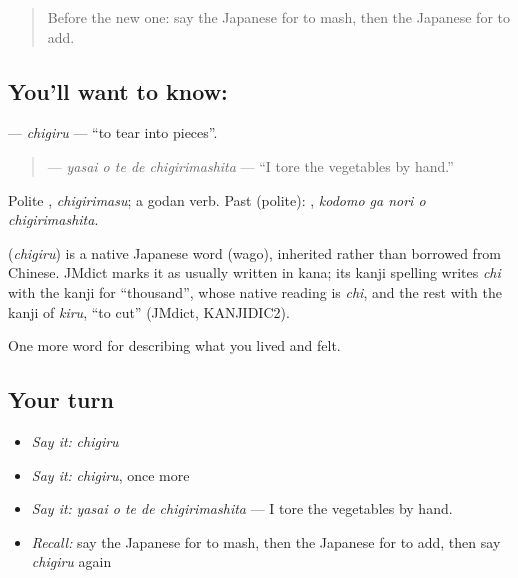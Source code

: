 \label{lesson:JA-C474-chigiru}



\begin{quote}
Before the new one: say the Japanese for to mash, then the Japanese for to add.
\end{quote}

\subsection*{You'll want to know: }
\textbf{} — \emph{chigiru} — \textquotedblleft{}to tear into pieces\textquotedblright{}.

\begin{quote}
\textbf{  } — \emph{yasai o te de chigirimashita} — \textquotedblleft{}I tore the vegetables by hand.\textquotedblright{}
\end{quote}

Polite \textbf{}, \emph{chigirimasu}; a godan verb. Past (polite): \textbf{  }, \emph{kodomo ga nori o chigirimashita}.

\begin{cousinweb}
\textbf{} (\emph{chigiru}) is a native Japanese word (wago), inherited rather than borrowed from Chinese. JMdict marks it as usually written in kana; its kanji spelling writes \emph{chi} with the kanji for \textquotedblleft{}thousand\textquotedblright{}, whose native reading is \emph{chi}, and the rest with the kanji of \emph{kiru}, \textquotedblleft{}to cut\textquotedblright{} (JMdict, KANJIDIC2).
\end{cousinweb}

\begin{grammarlens}[title={What you've built}]
One more word for describing what you lived and felt.
\end{grammarlens}

\subsection*{Your turn}
\begin{itemize}
\raggedright
  \item \emph{Say it:} \emph{chigiru}
  \item \emph{Say it:} \emph{chigiru}, once more
  \item \emph{Say it:} \emph{yasai o te de chigirimashita} — I tore the vegetables by hand.
  \item \emph{Recall:} say the Japanese for to mash, then the Japanese for to add, then say \emph{chigiru} again
\end{itemize}

